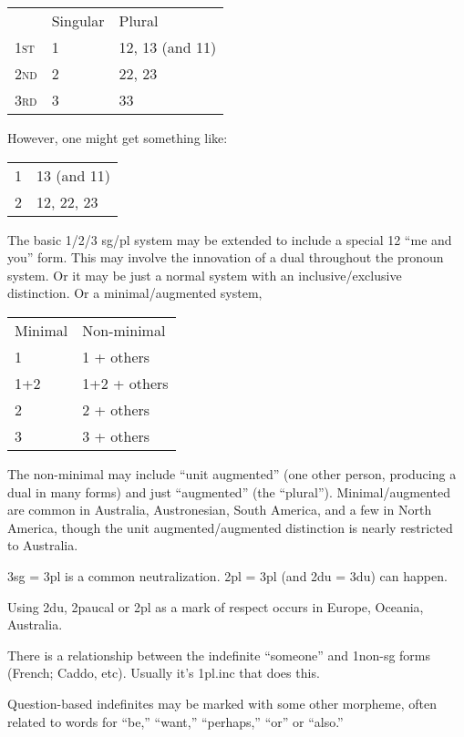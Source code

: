 \documentclass[11pt]{article}
\newcommand{\I}[1]{\textsc{#1}}   %
\begin{document}
\begin{center}
\begin{tabular}{lll}
  & Singular & Plural \\
\I{1st} & 1 & 12, 13 (and 11) \\
\I{2nd} & 2 & 22, 23 \\
\I{3rd} & 3 & 33
\end{tabular}
\end{center}

However, one might get something like:

\begin{center}
\begin{tabular}{ll}
1 & 13 (and 11) \\
2 & 12, 22, 23     
\end{tabular}
\end{center}

The basic 1/2/3 sg/pl system may be extended to include a special 12
``me and you'' form.  This may involve the innovation of a dual
throughout the pronoun system.  Or it may be just a normal system with
an inclusive/exclusive distinction.  Or a minimal/augmented system, 

\begin{center}
\begin{tabular}{ll}
Minimal & Non-minimal \\
1  & 1 + others \\
1+2 & 1+2 + others \\
2 & 2 + others \\
3 & 3 + others 
\end{tabular}
\end{center}

\noindent The non-minimal may include ``unit augmented'' (one other
person, producing a dual in many forms) and just ``augmented'' (the
``plural'').  Minimal/augmented are common in Australia, Austronesian,
South America, and a few in North America, though the unit
augmented/augmented distinction is nearly restricted to Australia.

3sg = 3pl is a common neutralization.  2pl = 3pl (and 2du = 3du) can
happen.

Using 2du, 2paucal or 2pl as a mark of respect occurs in Europe,
Oceania, Australia.

There is a relationship between the indefinite ``someone'' and
1non-sg forms (French; Caddo, etc).  Usually it's 1pl.inc that does
this. 

Question-based indefinites may be marked with some other morpheme,
often related to words for ``be,'' ``want,'' ``perhaps,'' ``or'' or
``also.''
\end{document}
